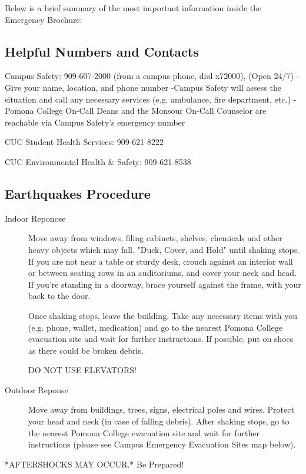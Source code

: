 \documentclass[12pt]{../SOP2}
\begin{document}
Below is a brief summary of the most important information inside the Emergency Brochure: 

\subsection{Helpful Numbers and Contacts}

Campus Safety: 909-607-2000 (from a campus phone, dial x72000), (Open 24/7)
-Give your name, location, and phone number
-Campus Safety will assess the situation and call any necessary services (e.g. ambulance, fire department, etc.)
-Pomona College On-Call Deans and the Monsour On-Call Counselor are reachable via Campus Safety’s emergency number
 
CUC Student Health Services: 909-621-8222

CUC Environmental Health \& Safety: 909-621-8538 

\subsection{Earthquakes Procedure} 

\begin{description}
  \item[Indoor Reponose] Move away from windows, filing cabinets, shelves, chemicals and other heavy objects which may fall. "Duck, Cover, and Hold" until shaking stops. If you are not near a table or sturdy desk, crouch against an interior wall or between seating rows in an auditoriums, and cover your neck and head. If you’re standing in a doorway, brace yourself against the frame, with your back to the door.

Once shaking stops, leave the building. Take any necessary items with you (e.g. phone, wallet, medication) and go to the nearest Pomona College evacuation site and wait for further instructions. If possible, put on shoes as there could be broken debris. 

DO NOT USE ELEVATORS!

\item[Outdoor Reponse] Move away from buildings, trees, signs, electrical poles and wires.
Protect your head and neck (in case of falling debris).
After shaking stops, go to the nearest Pomona College evacuation site and wait for further instructions (please see Campus Emergency Evacuation Sites map below).

\end{description}
	
	*AFTERSHOCKS MAY OCCUR.* Be Prepared!
\end{document}
